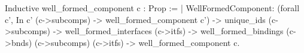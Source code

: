 Inductive well_formed_component c : Prop :=
    | WellFormedComponent:  
      (forall c', In c' (c->subcomps) -> well_formed_component c') ->
      unique_ids (c->subcomps)                                     -> 
      well_formed_interfaces (c->itfs)                             ->
      well_formed_bindings  (c->bnds) (c->subcomps) (c->itfs)      ->
      well_formed_component c.